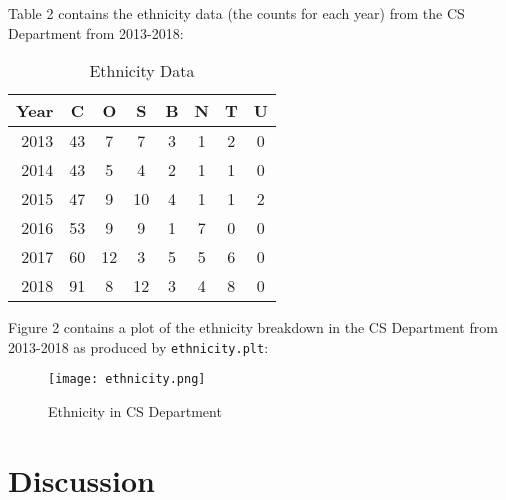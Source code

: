\documentclass[letterpaper]{article}
\begin{document}
Table 2 contains the ethnicity data (the counts for each year) from the CS Department from 2013-2018: \newline
\smallskip
\begin{table}[h!]
    \centering
    \begin{tabular}{r||c|c|c|c|c|c|c}
    Year	& C & O & S & B & N & T & U\\
    \hline
    2013	& 43 & 7 & 7 & 3 & 1 & 2 & 0\\
    2014	& 43 & 5 & 4 & 2 & 1 & 1 & 0\\
    2015	& 47 & 9 & 10 & 4 & 1 & 1 & 2\\
    2016	& 53 & 9 & 9 & 1 & 7 & 0 & 0\\
    2017	& 60 & 12 & 3 & 5 & 5 & 6 & 0\\
    2018	& 91 & 8 & 12 & 3 & 4 & 8 & 0\\
    \end{tabular}
    \caption{Ethnicity Data}
    \label{tbl:ethnicity}
\end{table}

\bigskip

Figure 2 contains a plot of the ethnicity breakdown in the CS Department from 2013-2018 as produced by {\tt ethnicity.plt}:
\smallskip
\begin{figure}[h!]
	\centering
	\caption{Ethnicity in CS Department}
	\texttt{[image: ethnicity.png]}
	\label{fig:results}
\end{figure}
\bigskip
\newpage
\section*{Discussion}
\end{document}
